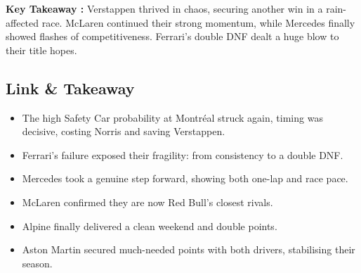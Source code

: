 \textbf{Key Takeaway :}
Verstappen thrived in chaos, securing another win in a rain-affected race. McLaren continued their strong momentum, while Mercedes finally showed flashes of competitiveness. Ferrari’s double DNF dealt a huge blow to their title hopes.


\subsection{Link \& Takeaway}

\begin{itemize}
    \item The high Safety Car probability at Montréal struck again, timing was decisive, costing Norris and saving Verstappen. 
    \item Ferrari’s failure exposed their fragility: from consistency to a double DNF. 
    \item Mercedes took a genuine step forward, showing both one-lap and race pace. 
    \item McLaren confirmed they are now Red Bull’s closest rivals. 
    \item Alpine finally delivered a clean weekend and double points. 
    \item Aston Martin secured much-needed points with both drivers, stabilising their season. 
\end{itemize}